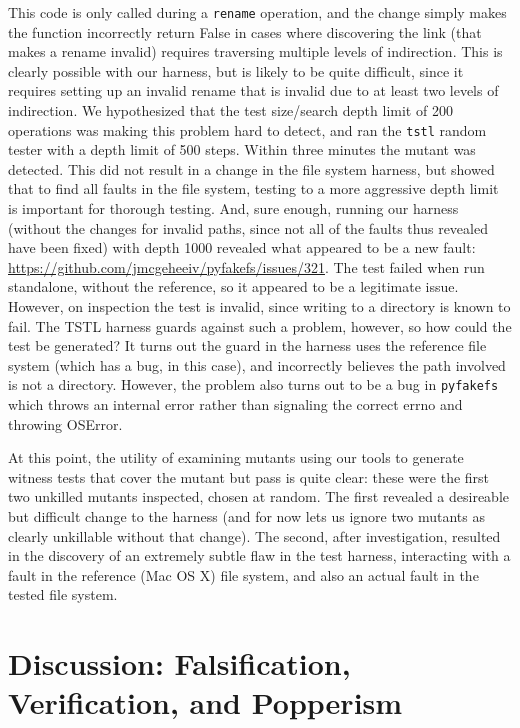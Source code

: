 \documentclass{svjour3}
\begin{document}
This code is only called during a {\tt rename} operation, and the change simply makes
the function incorrectly return False in cases where discovering the
link (that makes a rename invalid) requires traversing multiple levels
of indirection.  This is clearly possible with our harness, but is
likely to be quite difficult, since it requires setting up an invalid
rename that is invalid due to at least two levels of indirection.  We
hypothesized that the test size/search depth limit of 200 operations was making
this problem hard to detect, and ran the {\tt tstl} random tester with
a depth limit of 500 steps.  Within three minutes the mutant was
detected. This did not result in a change in the file system harness,
but showed that to find all faults in the file system, testing to a
more aggressive depth limit is important for thorough testing.  And,
sure enough, running our harness (without the changes for invalid
paths, since not all of the faults thus revealed have been fixed) with
depth 1000 revealed what appeared to be a new fault:  
\url{https://github.com/jmcgeheeiv/pyfakefs/issues/321}.  The test
failed when run standalone, without the reference, so it appeared to
be a legitimate issue.  However, on inspection the test is invalid,
since writing to a directory is known to fail.  The TSTL harness
guards against such a problem, however, so how could the test be
generated?  It turns out the guard in the harness uses the reference
file system (which has a bug, in this case), and incorrectly believes
the path involved is not a directory.  However, the problem also turns
out to be a bug in {\tt pyfakefs} which throws an internal error
rather than signaling the correct errno and throwing OSError.

At this point, the utility of examining mutants using our tools to
generate witness tests that cover the mutant but pass is quite clear:
these were the first two unkilled mutants inspected, chosen at
random.  The first revealed a desireable but difficult change to the
harness (and for now lets us ignore two mutants as clearly unkillable
without that change).  The second, after investigation, resulted in
the discovery of an extremely subtle flaw in the test harness,
interacting with a fault in the reference (Mac OS X) file system, and
also an actual fault in the tested file system.

\section{Discussion:  Falsification, Verification, and Popperism}
\end{document}
